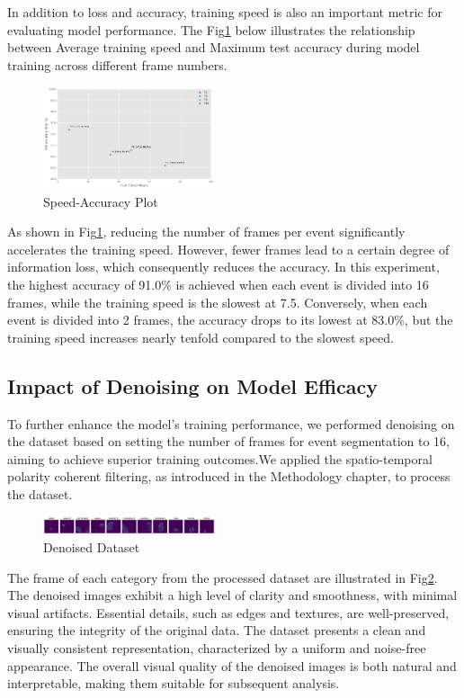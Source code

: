 \documentclass[conference]{IEEEtran}
\begin{document}
In addition to loss and accuracy, training speed is also an important metric for evaluating model performance. The Fig\ref{fig:speed-accuracy} below illustrates the relationship between Average training speed and Maximum test accuracy during model training across different frame numbers.
\begin{figure}[htbp]
    \centering
    \includegraphics[width=0.45\textwidth]{figure/Accuracy_speed.png}
    \caption{Speed-Accuracy Plot}
    \label{fig:speed-accuracy}
\end{figure}

As shown in Fig\ref{fig:speed-accuracy}, reducing the number of frames per event significantly accelerates the training speed. However, fewer frames lead to a certain degree of information loss, which consequently reduces the accuracy. In this experiment, the highest accuracy of 91.0\% is achieved when each event is divided into 16 frames, while the training speed is the slowest at 7.5. Conversely, when each event is divided into 2 frames, the accuracy drops to its lowest at 83.0\%, but the training speed increases nearly tenfold compared to the slowest speed.

\subsection{Impact of Denoising on Model Efficacy}
To further enhance the model's training performance, we performed denoising on the dataset based on setting the number of frames for event segmentation to 16, aiming to achieve superior training outcomes.We applied the spatio-temporal polarity coherent filtering, as introduced in the Methodology chapter, to process the dataset. 
\begin{figure}[htbp]
    \centering
    \includegraphics[width=0.45\textwidth]{figure/denoise.png}
    \caption{Denoised Dataset}
    \label{fig:denoise}
\end{figure}

The frame of each category from the processed dataset are illustrated in Fig\ref{fig:denoise}. The denoised images exhibit a high level of clarity and smoothness, with minimal visual artifacts. Essential details, such as edges and textures, are well-preserved, ensuring the integrity of the original data. 
The dataset presents a clean and visually consistent representation, characterized by a uniform and noise-free appearance. The overall visual quality of the denoised images is both natural and interpretable, making them suitable for subsequent analysis.
\end{document}
